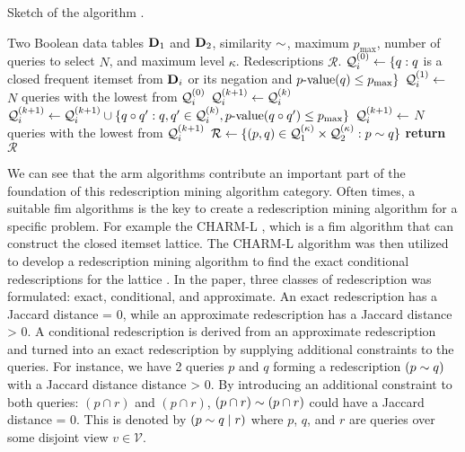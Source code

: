 \begin{algorithm}[tb]
    \caption{Sketch of the \algMID{} algorithm \citep{galbrun2018redescription}.}
      \label{alg:MID}
    \begin{algorithmic}[1]
    \small
      \Require Two Boolean data tables $\mathbf{D}_1$ and $\mathbf{D}_2$, similarity $\sim$, maximum \pvalue{} $p_{\max}$, number of queries to select $N$, and maximum level $\kappa$.
      \Ensure Redescriptions $\mathcal{R}$.
       \State $\mathcal{Q}^{(0)}_i \gets \{ q : q$ is a closed frequent itemset from $\mathbf{D}_i$ or its negation and $ \pvalue(\query) \leq p_{\max}\}$ \label{alg:MID:mine} %
       \State $\mathcal{Q}^{(1)}_i \gets$  $N$ queries with the lowest \pvalue from $\mathcal{Q}^{(0)}_i$ 
         \State $\mathcal{Q}^{(k+1)}_i \gets \mathcal{Q}^{(k)}_i$
            \State $\Queries^{(k+1)}_i \gets \Queries^{(k+1)}_i \cup \{ \query \lop \query' : \query, \query' \in \Queries^{(k)}_i, \pvalue(\query \lop \query') \leq p_{\max}\}$ \label{alg:MID:combine}
      \EndFor
       \State $\mathcal{Q}^{(k+1)}_i \gets$  $N$ queries with the lowest \pvalue from $\mathcal{Q}^{(k+1)}_i$ \label{alg:MID:filter}
      \EndFor
      \EndFor
      \State $\mathcal{R} \gets \{(p, q) \in \mathcal{Q}^{(\kappa)}_1 \times \mathcal{Q}^{(\kappa)}_2  : p \sim q\}$ \label{alg:MID:pair} %
      \State \textbf{return} $\mathcal{R}$
    \end{algorithmic}
\end{algorithm}

We can see that the \acl{arm} algorithms contribute an important part of the foundation of this redescription mining algorithm category.
Often times, a suitable \ac{fim} algorithms is the key to create a redescription mining algorithm for a specific problem.
For example the CHARM-L \citep{zakihsiao2005}, which is a \ac{fim} algorithm that can construct the closed itemset lattice.
The CHARM-L algorithm was then utilized to develop a redescription mining algorithm to find the exact conditional redescriptions for the lattice .
In the paper, three classes of redescription was formulated: exact, conditional, and approximate.
An exact redescription has a Jaccard distance = 0, while an approximate redescription has a Jaccard distance > 0.
A conditional redescription is derived from an approximate redescription and turned into an exact redescription by supplying additional constraints to the queries.
For instance, we have 2 queries $p$ and $q$ forming a redescription $(p \sim q)$ with a Jaccard distance distance > 0.
By introducing an additional constraint to both queries: $(p \cap r)$ and $(p \cap r)$, $(p \cap r) \sim (p \cap r)$ could have a Jaccard distance = 0.
This is denoted by $(p \sim q \mid r)$ where $p$, $q$, and $r$ are queries over some disjoint view $v \in \mathcal{V}$.
